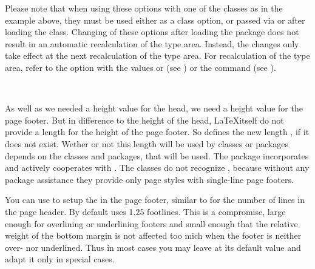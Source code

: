 Please note that when using these options with one of the
{\KOMAScript} classes as in the example above, they must be used
either as a class option, or passed via  or
 after loading the class. Changing of these options
after loading the  package does not result in an
automatic recalculation of the type area. Instead, the changes only
take effect at the next recalculation of the type area. For
recalculation of the type area, refer to the  option with
the values  or  (see
) or the
 command (see
).%
%
\EndIndexGroup


\begin{Declaration}
  \\
\end{Declaration}
As well as we needed a height value for
the head, we need a height value for the page footer. But in difference to the
height of the head, \LaTeX itself do not provide a length for the height of
the page footer. So  defines the new length
, if it does not
exist. Wether or not this length will be used by classes or packages depends
on the classes and packages, that will be used. The \KOMAScript{} package
 incorporates  and actively
cooperates with . The \KOMAScript{} classes do not recognize
, because without any package assistance they provide only
page styles with single-line page footers.

You can use  to setup the  in the
page footer, similar to  for the number of lines in the page
header. By default  uses 1.25 footlines. This is a
compromise, large enough for overlining or underlining footers and small
enough that the relative weight of the bottom margin is not affected too mich
when the footer is neither over- nor underlined. Thus in most cases you may
leave  at its default value and adapt it only in special
cases.

